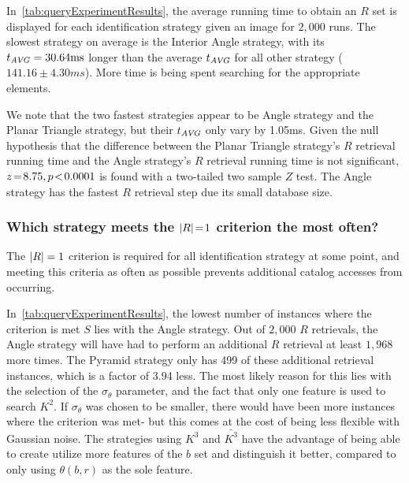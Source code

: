 In~\autoref{tab:queryExperimentResults}, the average running time to obtain an $R$ set is displayed for each
identification strategy given an image for $2{,}000$ runs.
The slowest strategy on average is the Interior Angle strategy, with its $t_{\AVG} = 30.64 \si{ms}$ longer than the
average $t_{\AVG}$ for all other strategy ($141.16 \pm 4.30 \si{ms}$).
More time is being spent searching for the appropriate elements.

We note that the two fastest strategies appear to be Angle strategy and the Planar Triangle strategy, but their
$t_\AVG$ only vary by 1.05ms.
Given the null hypothesis that the difference between the Planar Triangle strategy's $R$ retrieval running time and the
Angle strategy's $R$ retrieval running time is not significant, $z \seq 8.75, p\!<\!0.0001$ is found with a two-tailed
two sample $Z$ test.
The Angle strategy has the fastest $R$ retrieval step due its small database size.

\subsubsection{Which strategy meets the $\abs{R} \seq 1$ criterion the most often?}
The $\abs{R} = 1$ criterion is required for all identification strategy at some point, and meeting this criteria as
often as possible prevents additional catalog accesses from occurring.

In~\autoref{tab:queryExperimentResults}, the lowest number of instances where the criterion is met $S$ lies with the
Angle strategy.
Out of $2{,}000$ $R$ retrievals, the Angle strategy will have had to perform an additional $R$ retrieval at least
$1{,}968$ more times.
The Pyramid strategy only has 499 of these additional retrieval instances, which is a factor of 3.94 less.
The most likely reason for this lies with the selection of the $\sigma_\theta$ parameter, and the fact that only one
feature is used to search $K^2$.
If $\sigma_\theta$ was chosen to be smaller, there would have been more instances where the criterion was met- but
this comes at the cost of being less flexible with Gaussian noise.
The strategies using $K^3$ and $\bar{K^3}$ have the advantage of being able to create utilize more features of the
$b$ set and distinguish it better, compared to only using $\theta(b, r)$ as the sole feature.


